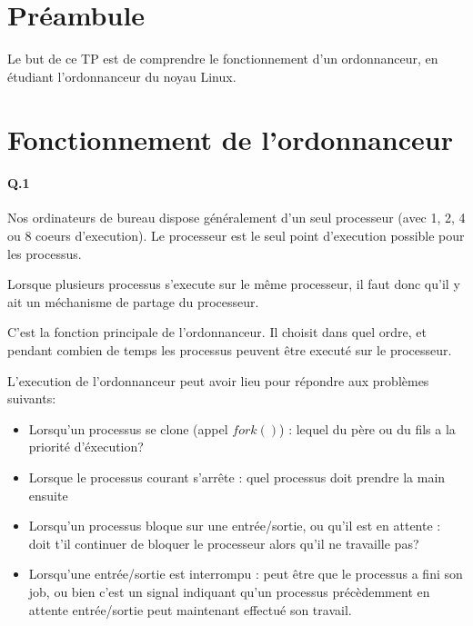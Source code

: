 \documentclass[10pt]{article}
\begin{document}
    \maketitle
    \tableofcontents
    \section{Préambule}
    
    Le but de ce TP est de comprendre le fonctionnement d'un ordonnanceur, en étudiant l'ordonnanceur du noyau Linux.

    \newpage
    \section{Fonctionnement de l'ordonnanceur}
        \paragraph{Q.1}
        Nos ordinateurs de bureau dispose généralement d'un seul processeur (avec 1, 2, 4 ou 8 coeurs d'execution).
        Le processeur est le seul point d'execution possible pour les processus.
        
        Lorsque plusieurs processus s'execute sur le même processeur, il faut donc qu'il y ait un méchanisme de partage du processeur.
    
        C'est la fonction principale de l'ordonnanceur.
        Il choisit dans quel ordre, et pendant combien de temps les processus peuvent être executé sur le processeur.
                        
        L'execution de l'ordonnanceur peut avoir lieu pour répondre aux problèmes suivants:
        
        \begin{itemize}
            \item Lorsqu'un processus se clone (appel $fork()$) : lequel du père ou du fils a la priorité d'éxecution?
            \item Lorsque le processus courant s'arrête : quel processus doit prendre la main ensuite
            \item Lorsqu'un processus bloque sur une entrée/sortie, ou qu'il est en attente :
            doit t'il continuer de bloquer le processeur alors qu'il ne travaille pas?
            \item Lorsqu'une entrée/sortie est interrompu : peut être que le processus a fini son job,
            ou bien c'est un signal indiquant qu'un processus précèdemment en attente entrée/sortie
            peut maintenant effectué son travail.
        \end{itemize}
        
\end{document}
